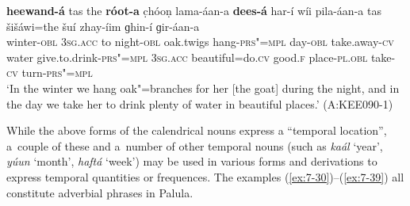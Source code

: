  
\ea
\label{ex:7-29}
\gll \textbf{heewand-á} tas the \textbf{róot-a} c̣hóoṇ  lama-áan-a \textbf{dees-á} har-í wíi
pila-áan-a tas šišáwi=the šuí zhay-íim ɡhin-í ɡir-áan-a\\
winter-\textsc{obl } \textsc{3sg.acc} to night-\textsc{obl} oak.twigs  hang-\textsc{prs"=mpl} day-\textsc{obl} take.away-\textsc{cv} water give.to.drink-\textsc{prs"=mpl} \textsc{3sg.acc}  beautiful=do.\textsc{cv} good.\textsc{f} place-\textsc{pl.obl} take-\textsc{cv} turn-\textsc{prs"=mpl} \\
\glt `In the winter we hang oak"=branches for her [the goat] during the night, and in the day we take her to drink plenty of water in beautiful places.' (A:KEE090-1)
\z

While the above  forms of the calendrical nouns express a ``temporal location'', a~couple of these and a~number of other temporal nouns (such as \textit{kaál} `year', \textit{yúun} `month', \textit{haftá} `week') may be used in various forms and derivations to express temporal quantities or frequences. The examples (\ref{ex:7-30})--(\ref{ex:7-39}) all constitute adverbial phrases in Palula.

